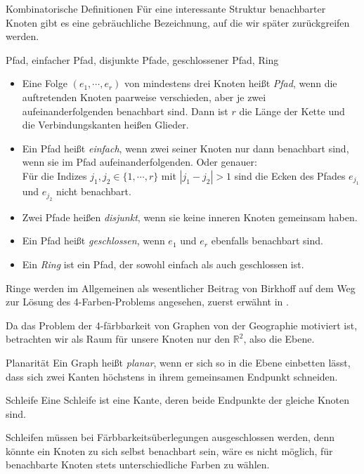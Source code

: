 \begin{section}{Kombinatorische Definitionen}
  Für eine interessante Struktur benachbarter Knoten gibt es eine gebräuchliche Bezeichnung, auf die wir später zurückgreifen werden.
  
  \begin{definition}{Pfad, einfacher Pfad, disjunkte Pfade, geschlossener Pfad, Ring}
  \-\ 
   \begin{itemize}
    \item Eine Folge $(e_1,\cdots,e_r)$ von mindestens drei Knoten heißt \textit{Pfad}, wenn die auftretenden Knoten paarweise verschieden, aber je zwei aufeinanderfolgenden benachbart sind. Dann ist $r$ die Länge der Kette und die Verbindungskanten heißen Glieder.
    \item Ein Pfad heißt \textit{einfach}, wenn zwei seiner Knoten nur dann benachbart sind, wenn sie im Pfad aufeinanderfolgenden. Oder genauer: \\
    Für die Indizes $j_1, j_2 \in \{1,\cdots,r\}$ mit $|j_1 - j_2| > 1$ sind die Ecken des Pfades $e_{j_1}$ und $e_{j_2}$ nicht benachbart.
    \item Zwei Pfade heißen \textit{disjunkt}, wenn sie keine inneren Knoten gemeinsam haben. 
    \item Ein Pfad heißt \textit{geschlossen}, wenn $e_1$ und $e_r$ ebenfalls benachbart sind.
    \item Ein \textit{Ring} ist ein Pfad, der sowohl einfach als auch geschlossen ist.
   \end{itemize}
  \end{definition}
  
  Ringe werden im Allgemeinen als wesentlicher Beitrag von Birkhoff auf dem Weg zur Lösung des 4-Farben-Problems angesehen, zuerst erwähnt in \cite{AmJMath35}.
  
  Da das Problem der 4-färbbarkeit von Graphen von der Geographie motiviert ist, betrachten wir als Raum für unsere Knoten nur den $\mathbb{R}^2$, also die Ebene.
  
  \begin{definition}{Planarität}
   Ein Graph heißt \textit{planar}, wenn er sich so in die Ebene einbetten lässt, dass sich zwei Kanten höchstens in ihrem gemeinsamen Endpunkt schneiden.
  \end{definition}
  
  \begin{definition}{Schleife}
   Eine Schleife ist eine Kante, deren beide Endpunkte der gleiche Knoten sind.
  \end{definition}
  Schleifen müssen bei Färbbarkeitsüberlegungen ausgeschlossen werden, denn könnte ein Knoten zu sich selbst benachbart sein, wäre es nicht möglich, für benachbarte Knoten stets unterschiedliche Farben zu wählen.
  

\end{section}
